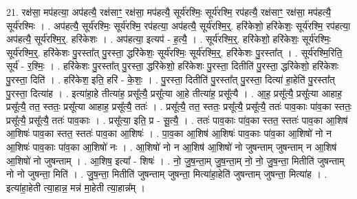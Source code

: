 \documentclass[17pt]{extarticle}
\begin{document}
21. रक्ष॑सा॒ मप॑हत्या॒ अप॑हत्यै॒ रक्ष॑साꣳ॒॒ रक्ष॑सा॒ मप॑हत्यै॒ सूर्य॑रश्मिः॒ सूर्य॑रश्मि॒ रप॑हत्यै॒ रक्ष॑साꣳ॒॒ रक्ष॑सा॒ मप॑हत्यै॒ सूर्य॑रश्मिः । . अप॑हत्यै॒ सूर्य॑रश्मिः॒ सूर्य॑रश्मि॒ रप॑हत्या॒ अप॑हत्यै॒ सूर्य॑रश्मि॒र्॒. हरि॑केशो॒ हरि॑केशः॒ सूर्य॑रश्मि॒ रप॑हत्या॒ अप॑हत्यै॒ सूर्य॑रश्मि॒र्॒. हरि॑केशः । . अप॑हत्या॒ इत्यप॑ - ह॒त्यै॒ । . सूर्य॑रश्मि॒र्॒. हरि॑केशो॒ हरि॑केशः॒ सूर्य॑रश्मिः॒ सूर्य॑रश्मि॒र्॒. हरि॑केशः पु॒रस्ता᳚त् पु॒रस्ता॒ द्धरि॑केशः॒ सूर्य॑रश्मिः॒ सूर्य॑रश्मि॒र्॒. हरि॑केशः पु॒रस्ता᳚त् । . सूर्य॑रश्मि॒रिति॒ सूर्य॑ - र॒श्मिः॒ । . हरि॑केशः पु॒रस्ता᳚त् पु॒रस्ता॒ द्धरि॑केशो॒ हरि॑केशः पु॒रस्ता॒ दितीति॑ पु॒रस्ता॒ द्धरि॑केशो॒ हरि॑केशः पु॒रस्ता॒ दिति॑ । . हरि॑केश॒ इति॒ हरि॑ - के॒शः॒ । . पु॒रस्ता॒ दितीति॑ पु॒रस्ता᳚त् पु॒रस्ता॒ दित्या॑ हा॒हेति॑ पु॒रस्ता᳚त् पु॒रस्ता॒ दित्या॑ह । . इत्या॑हा॒हे तीत्या॑ह॒ प्रसू᳚त्यै॒ प्रसू᳚त्या आ॒हे तीत्या॑ह॒ प्रसू᳚त्यै । . आ॒ह॒ प्रसू᳚त्यै॒ प्रसू᳚त्या आहाह॒ प्रसू᳚त्यै॒ तत॒ स्ततः॒ प्रसू᳚त्या आहाह॒ प्रसू᳚त्यै॒ ततः॑ । . प्रसू᳚त्यै॒ तत॒ स्ततः॒ प्रसू᳚त्यै॒ प्रसू᳚त्यै॒ ततः॑ पाव॒काः पा॑व॒का स्ततः॒ प्रसू᳚त्यै॒ प्रसू᳚त्यै॒ ततः॑ पाव॒काः । . प्रसू᳚त्या॒ इति॒ प्र - सू॒त्यै॒ । . ततः॑ पाव॒काः पा॑व॒का स्तत॒ स्ततः॑ पाव॒का आ॒शिष॑ आ॒शिषः॑ पाव॒का स्तत॒ स्ततः॑ पाव॒का आ॒शिषः॑ । . पा॒व॒का आ॒शिष॑ आ॒शिषः॑ पाव॒काः पा॑व॒का आ॒शिषो॑ नो न आ॒शिषः॑ पाव॒काः पा॑व॒का आ॒शिषो॑ नः । . आ॒शिषो॑ नो न आ॒शिष॑ आ॒शिषो॑ नो जुषन्ताम् जुषन्ताम् न आ॒शिष॑ आ॒शिषो॑ नो जुषन्ताम् । . आ॒शिष॒ इत्या᳚ - शिषः॑ । . नो॒ जु॒ष॒न्ता॒म् जु॒ष॒न्ता॒म् नो॒ नो॒ जु॒ष॒न्ता॒ मितीति॑ जुषन्ताम् नो नो जुषन्ता॒ मिति॑ । . जु॒ष॒न्ता॒ मितीति॑ जुषन्ताम् जुषन्ता॒ मित्या॑हा॒हेति॑ जुषन्ताम् जुषन्ता॒ मित्या॑ह । . इत्या॑हा॒हेती त्या॒हान्न॒ मन्न॑ मा॒हेती त्या॒हान्न᳚म् । \newline
\end{document}
